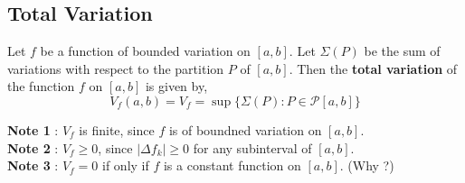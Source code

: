 \subsection{Total Variation}
\begin{definition}
	Let $f$ be a function of bounded variation on $[a,b]$.
	Let $\Sigma (P)$ be the sum of variations with respect to the partition $P$ of $[a,b]$.
	Then the \textbf{total variation} of the function $f$ on $[a,b]$ is given by,
	\[ V_f(a,b) = V_f = \sup \{ \Sigma (P) : P \in \mathscr{P}[a,b] \} \]
\end{definition}
\textbf{Note 1} : $V_f$ is finite, since $f$ is of boundned variation on $[a,b]$.\\

\textbf{Note 2} : $V_f \ge 0$, since $|\Delta f_k| \ge 0$ for any subinterval of $[a,b]$.\\


\textbf{Note 3} : $V_f = 0$ if only if $f$ is a constant function on $[a,b]$. (Why ?)

